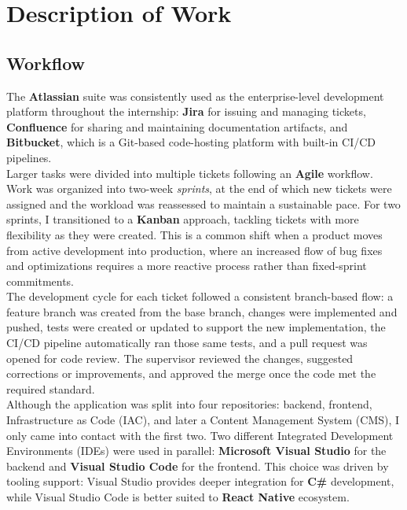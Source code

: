 \documentclass[11pt,a4paper]{article}
\begin{document}
\vspace*{0.5cm}

 
\section{Description of Work}
\label{sec:description}


\subsection{Workflow}
\label{sub:workflow}

The \textbf{Atlassian} suite was consistently used as the enterprise-level development platform throughout the internship: \textbf{Jira} for issuing and managing tickets, \textbf{Confluence} for sharing and maintaining documentation artifacts, and \textbf{Bitbucket}, which is a Git-based code-hosting platform with built-in CI/CD pipelines.\\
 
Larger tasks were divided into multiple tickets following an \textbf{Agile} workflow.
Work was organized into two-week \textit{sprints}, at the end of which new tickets were assigned and the workload was reassessed to maintain a sustainable pace.
For two sprints, I transitioned to a \textbf{Kanban} approach, tackling tickets with more flexibility as they were created.
This is a common shift when a product moves from active development into production, where an increased flow of bug fixes and optimizations requires a more reactive process rather than fixed-sprint commitments.\\
 
The development cycle for each ticket followed a consistent branch-based flow: a feature branch was created from the base branch, changes were implemented and pushed, tests were created or updated to support the new implementation, the CI/CD pipeline automatically ran those same tests, and a pull request was opened for code review.
The supervisor reviewed the changes, suggested corrections or improvements, and approved the merge once the code met the required standard.\\

Although the application was split into four repositories: backend, frontend, Infrastructure as Code (IAC), and later a Content Management System (CMS), I only came into contact with the first two.
Two different Integrated Development Environments (IDEs) were used in parallel: \textbf{Microsoft Visual Studio} for the backend and \textbf{Visual Studio Code} for the frontend.
This choice was driven by tooling support: Visual Studio provides deeper integration for \textbf{C\#} development, while Visual Studio Code is better suited to \textbf{React Native} ecosystem.
\end{document}
